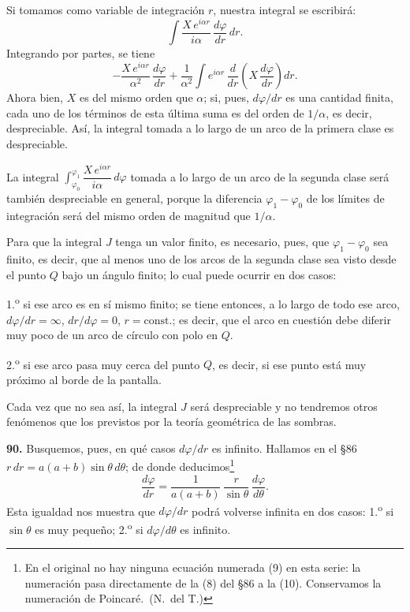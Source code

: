 Si tomamos como variable de integración $r$, nuestra integral se escribirá:
\[
\int \frac{X\,e^{i\alpha r}}{i\alpha}\,\frac{d\varphi}{dr}\,dr.
\]
Integrando por partes, se tiene
\[
-\frac{X\,e^{i\alpha r}}{\alpha^2}\,\frac{d\varphi}{dr}
+\frac{1}{\alpha^2}\int e^{i\alpha r}\,\frac{d}{dr}
\left(X\,\frac{d\varphi}{dr}\right)dr.
\]
Ahora bien, $X$ es del mismo orden que $\alpha$; si, pues, $d\varphi/dr$
es una cantidad finita, cada uno de los términos de esta última suma es
del orden de $1/\alpha$, es decir, despreciable. Así, la integral tomada a
lo largo de un arco de la primera clase es despreciable.

La integral $\displaystyle\int_{\varphi_0}^{\varphi_1}
\dfrac{X\,e^{i\alpha r}}{i\alpha}\,d\varphi$ tomada a lo largo de un arco
de la segunda clase será también despreciable en general, porque la
diferencia $\varphi_1-\varphi_0$ de los límites de integración será del
mismo orden de magnitud que $1/\alpha$.

Para que la integral $J$ tenga un valor finito, es necesario, pues, que
$\varphi_1-\varphi_0$ sea finito, es decir, que al menos uno de los arcos
de la segunda clase sea visto desde el punto $Q$ bajo un ángulo finito; lo
cual puede ocurrir en dos casos:

1.\textsuperscript{o} si ese arco es en sí mismo finito; se tiene entonces, a lo largo
de todo ese arco, $d\varphi/dr=\infty$, $dr/d\varphi=0$, $r=\text{const.}$;
es decir, que el arco en cuestión debe diferir muy poco de un arco de
círculo con polo en $Q$.

2.\textsuperscript{o} si ese arco pasa muy cerca del punto $Q$, es decir, si ese punto
está muy próximo al borde de la pantalla.

Cada vez que no sea así, la integral $J$ será despreciable y no tendremos
otros fenómenos que los previstos por la teoría geométrica de las
sombras.

\noindent\textbf{90.} Busquemos, pues, en qué casos $d\varphi/dr$ es
infinito. Hallamos en el §86 $r\,dr=a(a+b)\sin\theta\,d\theta$; de donde
deducimos\footnote{En el original no hay ninguna ecuación numerada (9)
en esta serie: la numeración pasa directamente de la (8) del §86 a la
(10). Conservamos la numeración de Poincaré.~(N.~del T.)}
\begin{equation}
\frac{d\varphi}{dr} = \frac{1}{a(a+b)}\,\frac{r}{\sin\theta}\,
\frac{d\varphi}{d\theta}.
\tag{10}
\end{equation}
Esta igualdad nos muestra que $d\varphi/dr$ podrá volverse infinita en dos
casos: 1.\textsuperscript{o} si $\sin\theta$ es muy pequeño; 2.\textsuperscript{o} si
$d\varphi/d\theta$ es infinito.

